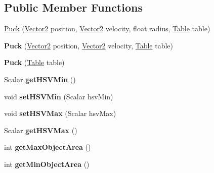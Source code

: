 \subsection*{Public Member Functions}
\begin{DoxyCompactItemize}
\item 
\hyperlink{classairhockeyjava_1_1physical_1_1_puck_a03ba208e68773624c6037caaa44b50bc}{Puck} (\hyperlink{classairhockeyjava_1_1util_1_1_vector2}{Vector2} position, \hyperlink{classairhockeyjava_1_1util_1_1_vector2}{Vector2} velocity, float radius, \hyperlink{classairhockeyjava_1_1physical_1_1_table}{Table} table)
\item 
\hypertarget{classairhockeyjava_1_1physical_1_1_puck_a233b07b6a65daca63cb61dd9840cb2e9}{}{\bfseries Puck} (\hyperlink{classairhockeyjava_1_1util_1_1_vector2}{Vector2} position, \hyperlink{classairhockeyjava_1_1util_1_1_vector2}{Vector2} velocity, \hyperlink{classairhockeyjava_1_1physical_1_1_table}{Table} table)\label{classairhockeyjava_1_1physical_1_1_puck_a233b07b6a65daca63cb61dd9840cb2e9}

\item 
\hypertarget{classairhockeyjava_1_1physical_1_1_puck_a149521738844f57dd77177c54beda23e}{}{\bfseries Puck} (\hyperlink{classairhockeyjava_1_1physical_1_1_table}{Table} table)\label{classairhockeyjava_1_1physical_1_1_puck_a149521738844f57dd77177c54beda23e}

\item 
\hypertarget{classairhockeyjava_1_1physical_1_1_puck_a8e073bed782fa198c6e5ea85dbe1198f}{}Scalar {\bfseries get\+H\+S\+V\+Min} ()\label{classairhockeyjava_1_1physical_1_1_puck_a8e073bed782fa198c6e5ea85dbe1198f}

\item 
\hypertarget{classairhockeyjava_1_1physical_1_1_puck_a2bcd411bf45060d045799a48619e41cc}{}void {\bfseries set\+H\+S\+V\+Min} (Scalar hsv\+Min)\label{classairhockeyjava_1_1physical_1_1_puck_a2bcd411bf45060d045799a48619e41cc}

\item 
\hypertarget{classairhockeyjava_1_1physical_1_1_puck_a8888c7afe99c8dd4e44904f165a2bb42}{}void {\bfseries set\+H\+S\+V\+Max} (Scalar hsv\+Max)\label{classairhockeyjava_1_1physical_1_1_puck_a8888c7afe99c8dd4e44904f165a2bb42}

\item 
\hypertarget{classairhockeyjava_1_1physical_1_1_puck_a25d43a19cc3c47bd09d2ec2a920180b5}{}Scalar {\bfseries get\+H\+S\+V\+Max} ()\label{classairhockeyjava_1_1physical_1_1_puck_a25d43a19cc3c47bd09d2ec2a920180b5}

\item 
\hypertarget{classairhockeyjava_1_1physical_1_1_puck_a157b5c2b031f496d95b97e62e8dae530}{}int {\bfseries get\+Max\+Object\+Area} ()\label{classairhockeyjava_1_1physical_1_1_puck_a157b5c2b031f496d95b97e62e8dae530}

\item 
\hypertarget{classairhockeyjava_1_1physical_1_1_puck_aa30aaad346e959bb54c0c6f821cf5326}{}int {\bfseries get\+Min\+Object\+Area} ()\label{classairhockeyjava_1_1physical_1_1_puck_aa30aaad346e959bb54c0c6f821cf5326}

\end{DoxyCompactItemize}
